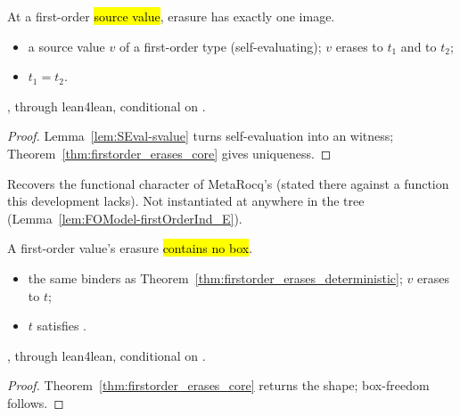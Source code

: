 \begin{theorem}
\label{thm:firstorder_erases_deterministic}
\leanok
{}
 At a first-order \hl{source value}, erasure has exactly one image.
\begin{itemize}
\item {} a source value $v$ of a first-order type (self-evaluating); $v$ erases to $t_1$ and to
$t_2$;
\item {} $t_1 = t_2$.
\end{itemize}
 \stProved{}, \stInherited{} through lean4lean, conditional on \stAssumed{}
.
\end{theorem}
\begin{proof}
\leanok
{}
 Lemma~\ref{lem:SEval-svalue} turns self-evaluation into an  witness;
Theorem~\ref{thm:firstorder_erases_core} gives uniqueness.
\end{proof}

\begin{remark}
 Recovers the functional character of MetaRocq's  (stated there against a
function this development lacks). Not instantiated at  anywhere in the tree
(Lemma~\ref{lem:FOModel-firstOrderInd_E}).
\end{remark}

\begin{theorem}
\label{thm:firstorder_no_box}
\leanok
{}
 A first-order value's erasure \hl{contains no box}.
\begin{itemize}
\item {} the same binders as Theorem~\ref{thm:firstorder_erases_deterministic}; $v$ erases to
$t$;
\item {} $t$ satisfies .
\end{itemize}
 \stProved{}, \stInherited{} through lean4lean, conditional on \stAssumed{}
.
\end{theorem}
\begin{proof}
\leanok
{}
 Theorem~\ref{thm:firstorder_erases_core} returns the shape; box-freedom follows.
\end{proof}

